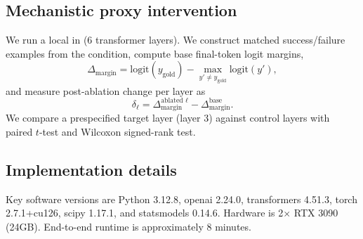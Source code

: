\subsection*{Mechanistic proxy intervention}
We run a local \mechanisticproxy in \proxy (6 transformer layers). We construct matched success/failure examples from the \direct condition, compute base final-token logit margins,
\begin{equation}
\Delta_{\text{margin}} = \text{logit}(y_{\text{gold}}) - \max_{y'\neq y_{\text{gold}}}\text{logit}(y'),
\end{equation}
and measure post-ablation change per layer as
\begin{equation}
\delta_{\ell} = \Delta^{\text{ablated }\ell}_{\text{margin}} - \Delta^{\text{base}}_{\text{margin}}.
\end{equation}
We compare a prespecified target layer (layer 3) against control layers with paired $t$-test and Wilcoxon signed-rank test.

\subsection*{Implementation details}
Key software versions are Python 3.12.8, openai 2.24.0, transformers 4.51.3, torch 2.7.1+cu126, scipy 1.17.1, and statsmodels 0.14.6. Hardware is 2$\times$ RTX 3090 (24GB). End-to-end runtime is approximately 8 minutes.
